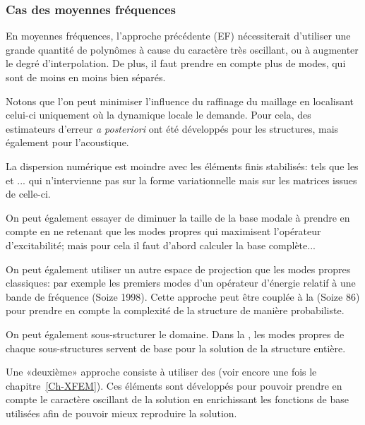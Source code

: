\medskip
\subsubsection{Cas des moyennes fréquences}

En moyennes fréquences, l'approche précédente (EF) nécessiterait d'utiliser une grande quantité de polynômes à cause du caractère très oscillant, ou à augmenter le degré d'interpolation. De plus, il faut prendre en compte plus de modes, qui sont de moins en moins bien séparés.

\medskip
Notons que l'on peut minimiser l'influence du raffinage du maillage en localisant celui-ci uniquement où la dynamique locale le demande. Pour cela, des estimateurs d'erreur \emph{a posteriori} ont été développés pour les structures, mais également pour l'acoustique.

La dispersion numérique est moindre avec les éléments finis stabilisés: tels que les  et ... qui n'intervienne pas sur la forme variationnelle mais sur les matrices issues de celle-ci.

\medskip
On peut également essayer de diminuer la taille de la base modale à prendre en compte en ne retenant que les modes propres qui maximisent l'opérateur d'excitabilité; mais pour cela il faut d'abord calculer la base complète...

On peut également utiliser un autre espace de projection que les modes propres classiques: par exemple les premiers modes d'un opérateur d'énergie relatif à une bande de fréquence (Soize 1998). Cette approche peut être couplée à la  (Soize 86) pour prendre en compte la complexité de la structure de manière probabiliste.

\medskip
On peut également sous-structurer le domaine. Dans la , les modes propres de chaque sous-structures servent de base pour la solution de la structure entière.

\bigskip
Une «deuxième» approche consiste à utiliser des  (voir encore une fois le chapitre~\ref{Ch-XFEM}). Ces éléments sont développés pour pouvoir prendre en compte le caractère oscillant de la solution en enrichissant les fonctions de base utilisées afin de pouvoir mieux reproduire la solution.

